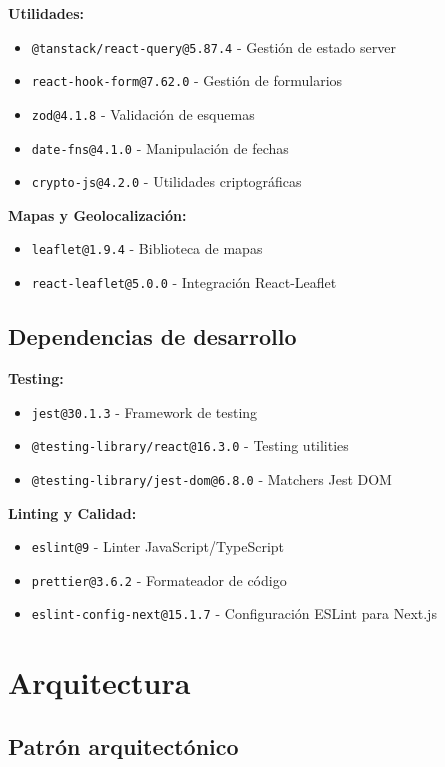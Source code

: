 \documentclass[12pt,a4paper]{article}
\begin{document}
\textbf{Utilidades:}
\begin{itemize}
    \item \texttt{@tanstack/react-query@5.87.4} - Gestión de estado server
    \item \texttt{react-hook-form@7.62.0} - Gestión de formularios
    \item \texttt{zod@4.1.8} - Validación de esquemas
    \item \texttt{date-fns@4.1.0} - Manipulación de fechas
    \item \texttt{crypto-js@4.2.0} - Utilidades criptográficas
\end{itemize}

\textbf{Mapas y Geolocalización:}
\begin{itemize}
    \item \texttt{leaflet@1.9.4} - Biblioteca de mapas
    \item \texttt{react-leaflet@5.0.0} - Integración React-Leaflet
\end{itemize}

\subsection{Dependencias de desarrollo}

\textbf{Testing:}
\begin{itemize}
    \item \texttt{jest@30.1.3} - Framework de testing
    \item \texttt{@testing-library/react@16.3.0} - Testing utilities
    \item \texttt{@testing-library/jest-dom@6.8.0} - Matchers Jest DOM
\end{itemize}

\textbf{Linting y Calidad:}
\begin{itemize}
    \item \texttt{eslint@9} - Linter JavaScript/TypeScript
    \item \texttt{prettier@3.6.2} - Formateador de código
    \item \texttt{eslint-config-next@15.1.7} - Configuración ESLint para Next.js
\end{itemize}

\section{Arquitectura}

\subsection{Patrón arquitectónico}
\end{document}
